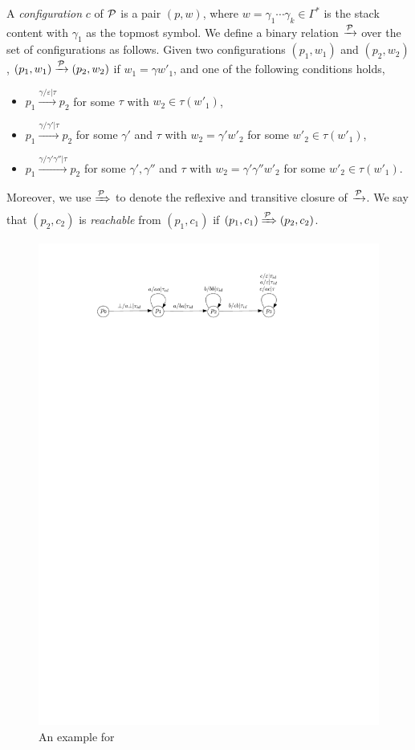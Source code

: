 A \emph{configuration} $c$ of ${\mathcal{P} }$ is a pair $(p, w)$, where $w = \gamma_1 \cdots \gamma_k \in \Gamma^*$ is the  stack content with $\gamma_1$ as the topmost symbol. We define a binary relation $\xrightarrow{{\mathcal{P} }}$ over the set of configurations as follows. Given two configurations $(p_1, w_1)$ and $(p_2, w_2)$, $(p_1, w_1) \xrightarrow{{\mathcal{P} }} (p_2, w_2)$ if $w_1 = \gamma w'_1$, and one of the following conditions holds,
\begin{itemize}
\item $p_1 \xrightarrow{\gamma/\varepsilon|\tau} p_2$ for some $\tau$ with  $w_2 \in \tau(w'_1)$, 
%
\item $p_1 \xrightarrow{\gamma/\gamma'|\tau} p_2$ for some $\gamma'$ and $\tau$ with $w_2 = \gamma' w'_2$ for some $w'_2 \in \tau(w'_1)$, 
%
\item $p_1 \xrightarrow{\gamma/\gamma' \gamma''|\tau} p_2$ for some $\gamma', \gamma''$ and $\tau$ with $w_2 = \gamma' \gamma'' w'_2$ for some $w'_2 \in \tau(w'_1)$.
\end{itemize}
Moreover, we use $\xRightarrow{{\mathcal{P} }}$ to denote the reflexive and transitive closure of $\xrightarrow{{\mathcal{P} }}$. We say that $(p_2, c_2)$ is \emph{reachable} from $(p_1, c_1)$ if $(p_1, c_1) \xRightarrow{{\mathcal{P} }} (p_2, c_2)$.
\begin{figure}[htb]
    \centering
	\includegraphics[scale = 0.9]{wstrpds-example.pdf}
	\caption{An example for \WOTrPDS}\label{fig-wstrpds-exmp}
\end{figure}

